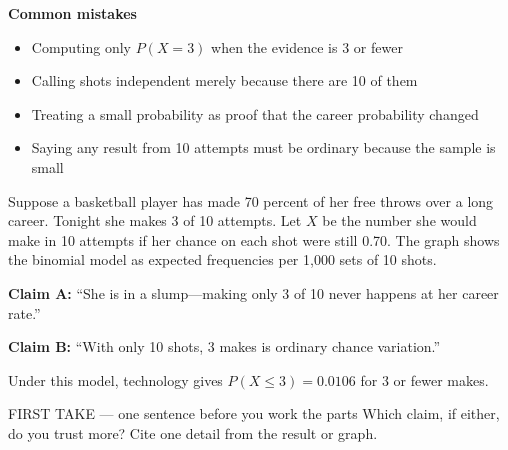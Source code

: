 \documentclass[11pt]{article}
\begin{document}
\textbf{Common mistakes}
\begin{itemize}[leftmargin=1.5em,itemsep=2pt,topsep=2pt]
  \item Computing only $P(X=3)$ when the evidence is 3 or fewer
  \item Calling shots independent merely because there are 10 of them
  \item Treating a small probability as proof that the career probability changed
  \item Saying any result from 10 attempts must be ordinary because the sample is small
\end{itemize}

\clearpage
{}

Suppose a basketball player has made 70 percent of her free throws over a long career. Tonight she makes 3 of 10 attempts. Let $X$ be the number she would make in 10 attempts if her chance on each shot were still 0.70. The graph shows the binomial model as expected frequencies per 1,000 sets of 10 shots.\par\smallskip \textbf{Claim A:} ``She is in a slump---making only 3 of 10 never happens at her career rate.''\par \textbf{Claim B:} ``With only 10 shots, 3 makes is ordinary chance variation.''\par Under this model, technology gives $P(X\leq3)=0.0106$ for 3 or fewer makes.\par
\begin{center}
\end{center}
\begin{firsttakebox}{FIRST TAKE --- one sentence before you work the parts}
Which claim, if either, do you trust more? Cite one detail from the result or graph.\par
{}
\end{firsttakebox}
\end{document}
